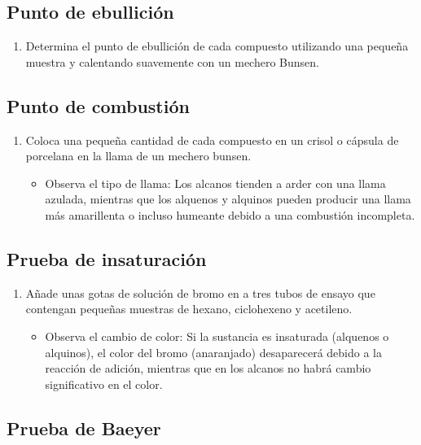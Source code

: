 \subsection{Punto de ebullición}

    \begin{enumerate}
        \item Determina el punto de ebullición de cada compuesto utilizando una pequeña muestra y calentando suavemente con un mechero Bunsen.
    \end{enumerate}
    
\subsection{Punto de combustión}

    \begin{enumerate}
        \item Coloca una pequeña cantidad de cada compuesto en un crisol o cápsula de porcelana en la llama de un mechero bunsen.
        \begin{itemize}
            \item Observa el tipo de llama: Los alcanos tienden a arder con una llama azulada, mientras que los alquenos y alquinos pueden producir una llama más amarillenta o incluso humeante debido a una combustión incompleta.
        \end{itemize}
    \end{enumerate}
    
\subsection{Prueba de insaturación}

    \begin{enumerate}
        \item Añade unas gotas de solución de bromo en  a tres tubos de ensayo que contengan pequeñas muestras de hexano, ciclohexeno y acetileno.
        \begin{itemize}
            \item Observa el cambio de color: Si la sustancia es insaturada (alquenos o alquinos), el color del bromo (anaranjado) desaparecerá debido a la reacción de adición, mientras que en los alcanos no habrá cambio significativo en el color.
        \end{itemize}
    \end{enumerate}
    
\subsection{Prueba de Baeyer}

